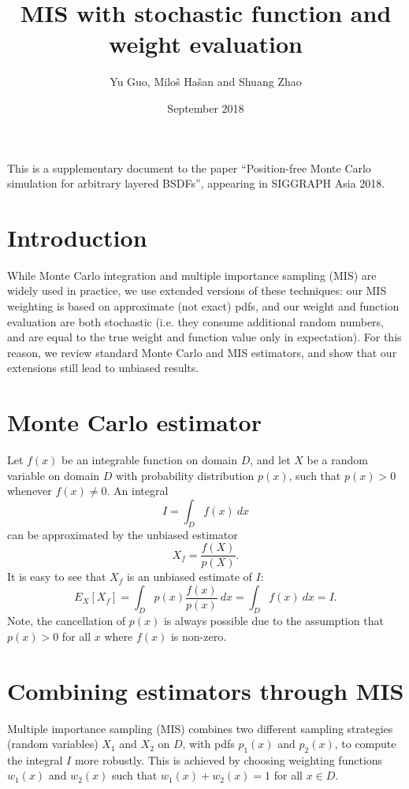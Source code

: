 \documentclass[11pt]{article}
\title{MIS with stochastic function and weight evaluation}
\date{September 2018}
\author{Yu Guo, Milo\v s Ha\v san and Shuang Zhao}
\begin{document}
\maketitle

This is a supplementary document to the paper ``Position-free Monte Carlo simulation for arbitrary layered BSDFs'', appearing in SIGGRAPH Asia 2018.


\section{Introduction}

While Monte	Carlo integration and multiple importance sampling (MIS) are widely used in practice, we use extended versions of these techniques: our MIS weighting is based on approximate (not exact) pdfs, and our weight and function evaluation are both stochastic (i.e. they consume additional random numbers, and are  equal to the true weight and function value only in expectation). For this reason, we review standard Monte Carlo and MIS estimators, and show that our extensions still lead to unbiased results.


\section{Monte Carlo estimator}

Let $f(x)$ be an integrable function on domain $D$, and let $X$ be a random variable on domain $D$ with probability distribution $p(x)$, such that $p(x) > 0$ whenever $f(x) \neq 0$. An integral
\[
I = \int_D f(x) \ dx
\]
can be approximated by the unbiased estimator
\[
X_f = \frac{f(X)}{p(X)}.
\]
It is easy to see that $X_f$ is an unbiased estimate of $I$:
\[
E_X[X_f] = \int_D p(x) \frac{f(x)}{p(x)} \ dx = \int_D f(x) \ dx = I.
\]
Note, the cancellation of $p(x)$ is always possible due to the assumption that $p(x) > 0$ for all $x$ where $f(x)$ is non-zero.


\section{Combining estimators through MIS}

Multiple importance sampling (MIS) combines two different sampling strategies (random variables) $X_1$ and $X_2$ on $D$, with pdfs $p_1(x)$ and $p_2(x)$, to compute the integral $I$ more robustly. This is achieved by choosing weighting functions $w_1(x)$ and $w_2(x)$ such that $w_1(x) + w_2(x) = 1$ for all $x \in D$.
\end{document}
